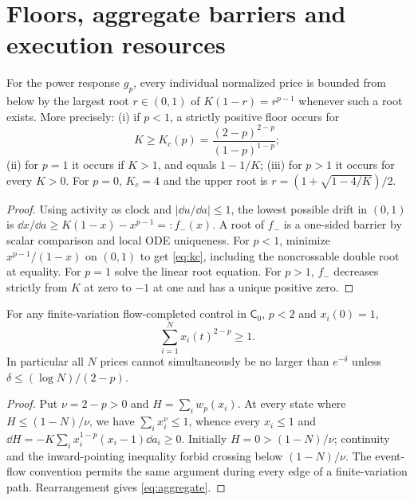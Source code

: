 \documentclass[review,hidelinks,onefignum,onetabnum]{siamonline250211}%
\begin{document}
\section{Floors, aggregate barriers and execution resources}\label{sec:resources}
\begin{theorem}\label{thm:floor}
For the power response $g_p$, every individual normalized price is
bounded from below by the largest root $r\in(0,1)$ of
$K(1-r)=r^{p-1}$ whenever such a root exists. More precisely:
(i) if $p<1$, a strictly positive floor occurs for
\begin{equation}\label{eq:kc}
 K\ge K_c(p)=\frac{(2-p)^{2-p}}{(1-p)^{1-p}};
\end{equation}
(ii) for $p=1$ it occurs if $K>1$, and equals $1-1/K$;
(iii) for $p>1$ it occurs for every $K>0$.
For $p=0$, $K_c=4$ and the upper root is
$r=(1+\sqrt{1-4/K})/2$.
\end{theorem}
\begin{proof}
Using activity as clock and $|\dd u/\dd a|\le1$, the lowest possible
drift in $(0,1)$ is
$\dd x/\dd a\ge K(1-x)-x^{p-1}=:f_-(x)$.
A root of $f_-$ is a one-sided barrier by scalar comparison and local
ODE uniqueness. For $p<1$, minimize
$x^{p-1}/(1-x)$ on $(0,1)$ to get \eqref{eq:kc}, including the
noncrossable double root at equality. For $p=1$ solve the linear
root equation. For $p>1$, $f_-$ decreases strictly from $K$ at zero
to $-1$ at one and has a unique positive zero.
\end{proof}

\begin{theorem}\label{thm:aggregate}
For any finite-variation flow-completed control in $\mathsf C_0$,
$p<2$ and $x_i(0)=1$,
\begin{equation}\label{eq:aggregate}
 \sum_{i=1}^N x_i(t)^{2-p}\ge1.
\end{equation}
In particular all $N$ prices cannot simultaneously be no larger than
$e^{-\delta}$ unless $\delta\le(\log N)/(2-p)$.
\end{theorem}
\begin{proof}
Put $\nu=2-p>0$ and $H=\sum_i w_p(x_i)$.
At every state where $H\le(1-N)/\nu$, we have
$\sum_i x_i^\nu\le1$, whence every $x_i\le1$ and
$\dd H=-K\sum_i x_i^{1-p}(x_i-1)\dd a_i\ge0$.
Initially $H=0>(1-N)/\nu$; continuity and the inward-pointing
inequality forbid crossing below $(1-N)/\nu$.
The event-flow convention permits the same argument during every edge
of a finite-variation path. Rearrangement gives \eqref{eq:aggregate}.
\end{proof}
\end{document}
